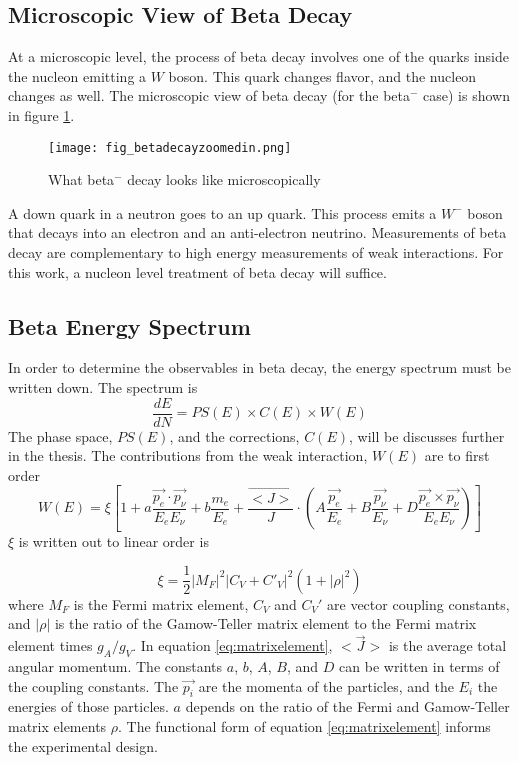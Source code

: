 \documentclass[../MaxHughesThesis.tex]{subfiles}
\begin{document}
\subsection{Microscopic View of Beta Decay}
At a microscopic level, the process of beta decay involves one of the quarks inside the nucleon emitting a $W$ boson. 
This quark changes flavor, and the nucleon changes as well. 
The microscopic view of beta decay (for the beta$^{-}$ case) is shown in figure \ref{fig:betadecaymicro}.

\begin{figure}[!htb]
	\centerline{\texttt{[image: fig\_betadecayzoomedin.png]}}
	\caption{What beta$^{-}$ decay looks like microscopically}
	\label{fig:betadecaymicro}
\end{figure}
A down quark in a neutron goes to an up quark.
This process emits a $W^{-}$ boson that decays into an electron and an anti-electron neutrino.
Measurements of beta decay are complementary to high energy measurements of weak interactions.
For this work, a nucleon level treatment of beta decay will suffice.  

\subsection{Beta Energy Spectrum}
In order to determine the observables in beta decay, the energy spectrum must be written down. 
The spectrum is %
\begin{equation}
	\frac{dE}{dN} = PS(E) \times C(E) \times W(E)  
	\label{eq:betaenspectrum}
\end{equation}
The phase space, $PS(E)$, and the corrections, $C(E)$, will be discusses further in the thesis. 
The contributions from the weak interaction, $W(E)$ are to first order \cite{Jack57} %
\begin{equation}
	 W(E) = \xi [1 + a \frac{\vec{p_{e}} \cdot \vec{p_{\nu}}} {E_{e} E_{\nu}}  +  b \frac{m_{e}}{E_{e}} + \frac{\vec{<J>}}{J} \cdot (A \frac{ \vec{p_{e}} }{E_{e}} + B \frac{\vec{p_{\nu}}}{E_{\nu}} + D \frac{\vec{p_{e}} \times \vec{p_{\nu}}}{E_{e} E_{\nu}})]
	\label{eq:matrixelement}
\end{equation}
$\xi$ is written out to linear order is %
 
\begin{equation}
	\xi = \frac{1}{2} |M_{F}|^{2} |C_{V} + C'_{V}|^{2} (1 + |\rho|^{2})
	\label{eq:xiwrittenout}
\end{equation}
where $M_{F}$ is the Fermi matrix element, $C_{V}$ and $C_{V}'$ are vector coupling constants, and $|\rho|$ is the ratio of the Gamow-Teller matrix element to the Fermi matrix element times $g_{A}/g_{V}$.
In equation \ref{eq:matrixelement}, $<\vec{J}>$ is the average total angular momentum. 
The constants $a$, $b$, $A$, $B$, and $D$ can be written in terms of the coupling constants.
The $\vec{p_{i}}$ are the momenta of the particles, and the $E_{i}$ the energies of those particles.
$a$ depends on the ratio of the Fermi and Gamow-Teller matrix elements $\rho$.
The functional form of equation \ref{eq:matrixelement} informs the experimental design.
\end{document}
